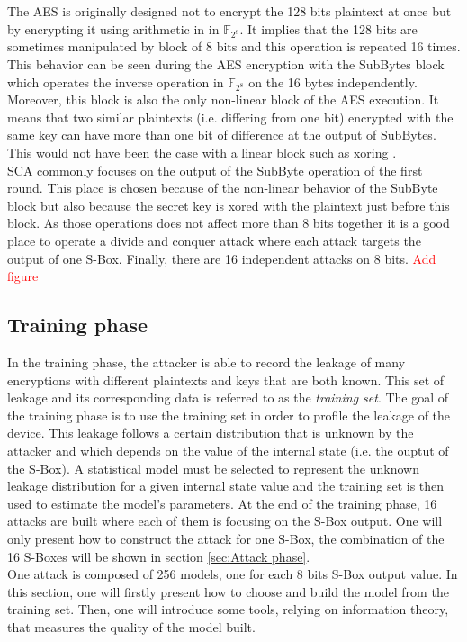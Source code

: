The AES is originally designed not to encrypt the 128 bits plaintext at 
once but by encrypting it using arithmetic in in $\mathbb{F}_{2^8}$. It 
implies that the 128 bits are sometimes manipulated by block of 8 bits and 
this operation is repeated 16 times. This behavior can be seen during the 
AES encryption with the SubBytes block which operates the inverse 
operation in $\mathbb{F}_{2^8}$ on the 16 bytes independently. Moreover, 
this block is also the only non-linear block of the AES execution. It 
means that two similar plaintexts (i.e. differing from one bit) encrypted 
with the same key can have  more than one bit of difference at the output 
of SubBytes. This would not have been the case with a linear block such as 
xoring .\\

SCA commonly focuses on the output of the SubByte operation of the first 
round. This place is chosen because of the non-linear behavior of the 
SubByte block but also because the secret key is xored with the plaintext 
just before this block. As those operations does not affect more than 8 
bits together it is a good place to operate a divide and conquer attack 
where each attack targets the output of one S-Box. Finally, there are 16 
independent attacks on 8 bits.
\textcolor{red}{Add figure}
\subsection{Training phase}\label{sec:Training phase}
In the training phase, the attacker is able to record the leakage of many 
encryptions with different plaintexts and keys that are both known. This 
set of leakage and its corresponding data is referred to as the 
\textit{training set}. The goal of the training phase is to use the 
training set in order to profile the leakage of the device. This leakage 
follows a certain distribution that is unknown by the attacker and which 
depends on the value of the internal state (i.e. the ouptut of the S-Box). 
A statistical model must be selected to represent the unknown leakage 
distribution for a given internal state value and the training set is then 
used to estimate the model's parameters. At the end of the training phase, 
16 attacks are built where each of them is focusing on the S-Box output. 
One will only present how to construct the attack for one S-Box, the 
combination of the 16 S-Boxes will be shown in section \ref{sec:Attack 
phase}.\\

One attack is composed of 256 models, one for each 8 bits S-Box output 
value. In this section, one will firstly present how to choose and build 
the model from the training set. Then, one will introduce some tools, 
relying on information theory, that measures the quality of the model 
built.


